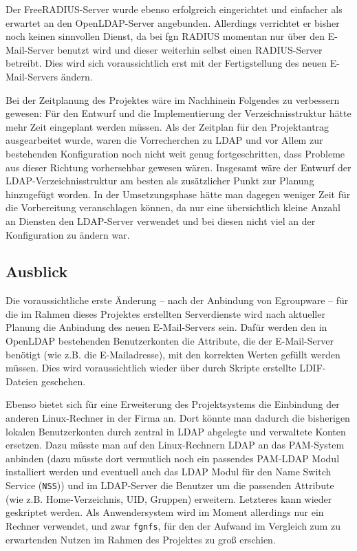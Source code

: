 \documentclass[11pt,a4paper,titlepage=firstiscover,headsepline,bibtotoc]{scrartcl} %
\begin{document}
Der FreeRADIUS-Server wurde ebenso erfolgreich eingerichtet und einfacher als erwartet an den OpenLDAP-Server angebunden. Allerdings verrichtet er bisher noch keinen sinnvollen Dienst, da bei fgn RADIUS momentan nur über den E-Mail-Server benutzt wird und dieser weiterhin selbst einen RADIUS-Server betreibt. Dies wird sich voraussichtlich erst mit der Fertigstellung des neuen E-Mail-Servers ändern.

Bei der Zeitplanung des Projektes wäre im Nachhinein Folgendes zu verbessern gewesen: Für den Entwurf und die Implementierung der Verzeichnisstruktur hätte mehr Zeit eingeplant werden müssen. Als der Zeitplan für den Projektantrag ausgearbeitet wurde, waren die Vorrecherchen zu LDAP und vor Allem zur bestehenden Konfiguration noch nicht weit genug fortgeschritten, dass Probleme aus dieser Richtung vorhersehbar gewesen wären. Insgesamt wäre der Entwurf der LDAP-Verzeichnisstruktur am besten als zusätzlicher Punkt zur Planung hinzugefügt worden. In der Umsetzungsphase hätte man dagegen weniger Zeit für die Vorbereitung veranschlagen können, da nur eine übersichtlich kleine Anzahl an Diensten den LDAP-Server verwendet und bei diesen nicht viel an der Konfiguration zu ändern war.

\subsection{Ausblick}
Die voraussichtliche erste Änderung -- nach der Anbindung von Egroupware -- für die im Rahmen dieses Projektes erstellten Serverdienste wird nach aktueller Planung die Anbindung des neuen E-Mail-Servers sein. Dafür werden den in OpenLDAP bestehenden Benutzerkonten die Attribute, die der E-Mail-Server benötigt (wie z.B. die E-Mailadresse), mit den korrekten Werten gefüllt werden müssen. Dies wird voraussichtlich wieder über durch Skripte erstellte LDIF-Dateien geschehen.

Ebenso bietet sich für eine Erweiterung des Projektsystems die Einbindung der anderen Linux-Rechner in der Firma an. Dort könnte man dadurch die bisherigen lokalen Benutzerkonten durch zentral in LDAP abgelegte und verwaltete Konten ersetzen. Dazu müsste man auf den Linux-Rechnern LDAP an das PAM-System anbinden (dazu müsste dort vermutlich noch ein passendes PAM-LDAP Modul installiert werden und eventuell auch das LDAP Modul für den Name Switch Service (\texttt{NSS})) und im LDAP-Server die Benutzer um die passenden Attribute (wie z.B. Home-Verzeichnis, UID, Gruppen) erweitern. Letzteres kann wieder geskriptet werden. Als Anwendersystem wird im Moment allerdings nur ein Rechner verwendet, und zwar \texttt{fgnfs}, für den der Aufwand im Vergleich zum zu erwartenden Nutzen im Rahmen des Projektes zu groß erschien.
\end{document}
